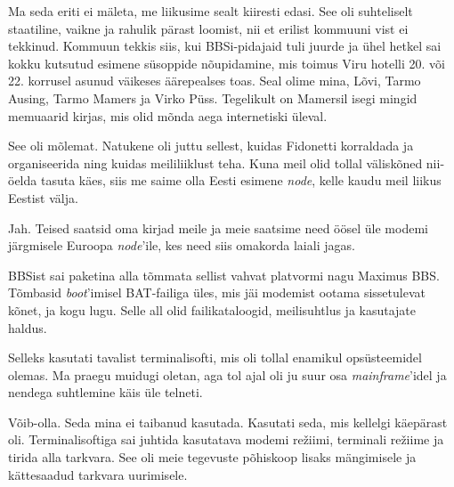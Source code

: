 Ma seda eriti ei mäleta, me liikusime sealt kiiresti 
edasi. See oli suhteliselt staatiline, vaikne ja rahulik pärast 
loomist, nii et erilist kommuuni vist ei tekkinud. Kommuun tekkis siis, kui BBSi-pidajaid tuli juurde ja ühel
hetkel sai kokku kutsutud esimene süsoppide nõupidamine, mis toimus Viru 
hotelli 20. või 22. korrusel asunud väikeses äärepealses toas. Seal olime mina, 
Lõvi, Tarmo Ausing, Tarmo 
Mamers ja Virko Püss. 
Tegelikult on Mamersil isegi mingid memuaarid kirjas, mis olid mõnda aega 
internetiski üleval. 


See oli mõlemat. Natukene oli juttu sellest, kuidas Fidonetti 
korraldada ja organiseerida ning kuidas meililiiklust teha. Kuna meil olid 
tollal väliskõned nii-öelda tasuta käes, siis me saime olla Eesti 
esimene \emph{node}, kelle kaudu meil liikus Eestist välja. 


Jah. Teised saatsid oma kirjad meile ja meie saatsime need öösel üle 
modemi järgmisele Euroopa \emph{node}'ile, kes need siis omakorda laiali jagas.


BBSist sai paketina
alla tõmmata sellist vahvat platvormi nagu Maximus BBS. 
Tõmbasid \emph{boot}'imisel BAT-failiga üles, mis jäi modemist ootama sissetulevat kõnet, ja kogu lugu. Selle all olid failikataloogid, 
meilisuhtlus ja kasutajate haldus.


Selleks kasutati tavalist terminalisofti, mis oli tollal enamikul 
opsüsteemidel olemas. Ma praegu muidugi oletan, aga tol ajal oli ju suur 
osa \emph{mainframe}'idel ja nendega suhtlemine käis üle telneti.


Võib-olla. Seda mina ei taibanud kasutada. Kasutati seda, mis kellelgi käepärast oli. Terminalisoftiga
sai juhtida kasutatava modemi režiimi, terminali režiime ja tirida 
alla tarkvara. See oli meie tegevuste põhiskoop lisaks mängimisele 
ja kättesaadud tarkvara uurimisele.


